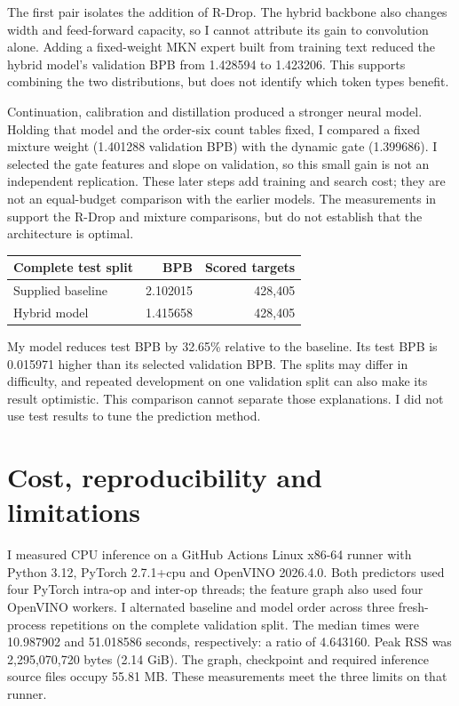 \documentclass[11pt,a4paper]{article}
\begin{document}
The first pair isolates the addition of R-Drop. The hybrid backbone also changes width and feed-forward capacity, so I cannot attribute its gain to convolution alone. Adding a fixed-weight MKN expert built from training text reduced the hybrid model's validation BPB from 1.428594 to 1.423206. This supports combining the two distributions, but does not identify which token types benefit.

Continuation, calibration and distillation produced a stronger neural model. Holding that model and the order-six count tables fixed, I compared a fixed mixture weight (1.401288 validation BPB) with the dynamic gate (1.399686). I selected the gate features and slope on validation, so this small gain is not an independent replication. These later steps add training and search cost; they are not an equal-budget comparison with the earlier models. The measurements in  support the R-Drop and mixture comparisons, but do not establish that the architecture is optimal.

\begin{center}
\begin{tabular}{lrr}
\toprule
Complete test split & BPB & Scored targets \\
\midrule
Supplied baseline & 2.102015 & 428,405 \\
Hybrid model & 1.415658 & 428,405 \\
\bottomrule
\end{tabular}
\end{center}

My model reduces test BPB by 32.65\% relative to the baseline. Its test BPB is 0.015971 higher than its selected validation BPB. The splits may differ in difficulty, and repeated development on one validation split can also make its result optimistic. This comparison cannot separate those explanations. I did not use test results to tune the prediction method.

\section{Cost, reproducibility and limitations}

I measured CPU inference on a GitHub Actions Linux x86-64 runner with Python 3.12, PyTorch 2.7.1+cpu and OpenVINO 2026.4.0. Both predictors used four PyTorch intra-op and inter-op threads; the feature graph also used four OpenVINO workers. I alternated baseline and model order across three fresh-process repetitions on the complete validation split. The median times were 10.987902 and 51.018586 seconds, respectively: a ratio of 4.643160. Peak RSS was 2,295,070,720 bytes (2.14 GiB). The graph, checkpoint and required inference source files occupy 55.81 MB. These measurements meet the three limits on that runner.
\end{document}
